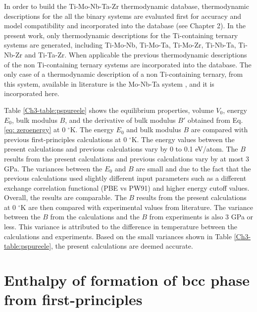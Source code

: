 In order to build the Ti-Mo-Nb-Ta-Zr thermodynamic database, thermodynamic descriptions for the all the binary systems are evaluated first for accuracy and model compatibility and incorporated into the database (see Chapter 2). In the present work, only thermodynamic descriptions for the Ti-containing ternary systems are generated, including Ti-Mo-Nb, Ti-Mo-Ta, Ti-Mo-Zr, Ti-Nb-Ta, Ti-Nb-Zr and Ti-Ta-Zr. When applicable the previous thermodynamic descriptions of the non Ti-containing ternary systems are incorporated into the database. The only case of a thermodynamic description of a non Ti-containing ternary, from this system, available in literature is the Mo-Nb-Ta system \cite{Xiong2004}, and it is incorporated here.

Table \ref{Ch3-table:pspureele} shows the equilibrium properties, volume $V_{0}$, energy $E_{0}$, bulk modulus $B$, and the derivative of bulk modulus $B'$ obtained from Eq. \ref{eq: zeroenergy} at 0 $^{\circ}$K. The energy $E_{0}$ and bulk modulus $B$ are compared with previous first-principles calculations at 0 $^{\circ}$K. The energy values between the present calculations and previous calculations vary by 0 to 0.1 eV/atom. The $B$ results from the present calculations and previous calculations vary by at most 3 GPa. The variances between the $E_{0}$ and $B$ are small and due to the fact that the previous calculations used slightly different input parameters such as a different exchange correlation functional (PBE vs PW91) and higher energy cutoff values. Overall, the results are comparable. The $B$ results from the present calculations at 0 $^{\circ}$K are then compared with experimental values from literature. The variance between the $B$ from the calculations and the $B$ from experiments is also 3 GPa or less. This variance is attributed to the difference in temperature between the calculations and experiments. Based on the small variances shown in Table \ref{Ch3-table:pspureele}, the present calculations are deemed accurate. 


\section{Enthalpy of formation of bcc phase from first-principles}

